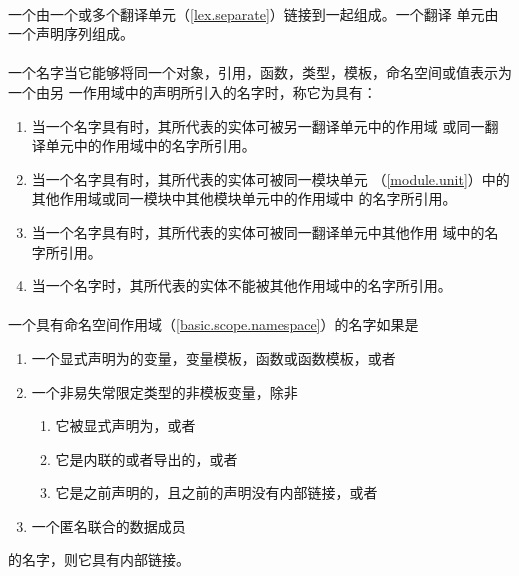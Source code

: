 \paragraph{} %
一个由一个或多个翻译单元（\ref{lex.separate}）链接到一起组成。一个翻译
单元由一个声明序列组成。


\paragraph{} %
一个名字当它能够将同一个对象，引用，函数，类型，模板，命名空间或值表示为一个由另
一作用域中的声明所引入的名字时，称它为具有：
\begin{enumerate}
  \item 当一个名字具有时，其所代表的实体可被另一翻译单元中的作用域
        或同一翻译单元中的作用域中的名字所引用。
  \item 当一个名字具有时，其所代表的实体可被同一模块单元
        （\ref{module.unit}）中的其他作用域或同一模块中其他模块单元中的作用域中
        的名字所引用。
  \item 当一个名字具有时，其所代表的实体可被同一翻译单元中其他作用
        域中的名字所引用。
  \item 当一个名字时，其所代表的实体不能被其他作用域中的名字所引用。
\end{enumerate}

\paragraph{} %
一个具有命名空间作用域（\ref{basic.scope.namespace}）的名字如果是
\begin{enumerate}
  \item 一个显式声明为的变量，变量模板，函数或函数模板，或者
  \item 一个非易失常限定类型的非模板变量，除非
        \begin{enumerate}
          \item 它被显式声明为，或者
          \item 它是内联的或者导出的，或者
          \item 它是之前声明的，且之前的声明没有内部链接，或者
        \end{enumerate}
  \item 一个匿名联合的数据成员
\end{enumerate}
的名字，则它具有内部链接。

